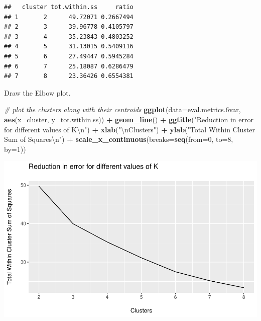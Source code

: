 \documentclass[]{article}
\newenvironment{Shaded}{\begin{snugshade}}{\end{snugshade}}
\newcommand{\KeywordTok}[1]{\textcolor[rgb]{0.13,0.29,0.53}{\textbf{#1}}}
\newcommand{\DataTypeTok}[1]{\textcolor[rgb]{0.13,0.29,0.53}{#1}}
\newcommand{\DecValTok}[1]{\textcolor[rgb]{0.00,0.00,0.81}{#1}}
\newcommand{\CharTok}[1]{\textcolor[rgb]{0.31,0.60,0.02}{#1}}
\newcommand{\StringTok}[1]{\textcolor[rgb]{0.31,0.60,0.02}{#1}}
\newcommand{\CommentTok}[1]{\textcolor[rgb]{0.56,0.35,0.01}{\textit{#1}}}
\newcommand{\OperatorTok}[1]{\textcolor[rgb]{0.81,0.36,0.00}{\textbf{#1}}}
\newcommand{\NormalTok}[1]{#1}
\begin{document}
\begin{verbatim}
##   cluster tot.within.ss     ratio
## 1       2      49.72071 0.2667494
## 2       3      39.96778 0.4105797
## 3       4      35.23843 0.4803252
## 4       5      31.13015 0.5409116
## 5       6      27.49447 0.5945284
## 6       7      25.18087 0.6286479
## 7       8      23.36426 0.6554381
\end{verbatim}

Draw the Elbow plot.

\begin{Shaded}
\begin{Highlighting}[]
\CommentTok{# plot the clusters along with their centroids}
\KeywordTok{ggplot}\NormalTok{(}\DataTypeTok{data=}\NormalTok{eval.metrics.6var, }\KeywordTok{aes}\NormalTok{(}\DataTypeTok{x=}\NormalTok{cluster, }\DataTypeTok{y=}\NormalTok{tot.within.ss)) }\OperatorTok{+}\StringTok{ }
\StringTok{  }\KeywordTok{geom_line}\NormalTok{() }\OperatorTok{+}
\StringTok{  }\KeywordTok{ggtitle}\NormalTok{(}\StringTok{"Reduction in error for different values of K}\CharTok{\textbackslash{}n}\StringTok{"}\NormalTok{) }\OperatorTok{+}
\StringTok{  }\KeywordTok{xlab}\NormalTok{(}\StringTok{"}\CharTok{\textbackslash{}n}\StringTok{Clusters"}\NormalTok{) }\OperatorTok{+}\StringTok{ }
\StringTok{  }\KeywordTok{ylab}\NormalTok{(}\StringTok{"Total Within Cluster Sum of Squares}\CharTok{\textbackslash{}n}\StringTok{"}\NormalTok{) }\OperatorTok{+}
\StringTok{  }\KeywordTok{scale_x_continuous}\NormalTok{(}\DataTypeTok{breaks=}\KeywordTok{seq}\NormalTok{(}\DataTypeTok{from=}\DecValTok{0}\NormalTok{, }\DataTypeTok{to=}\DecValTok{8}\NormalTok{, }\DataTypeTok{by=}\DecValTok{1}\NormalTok{))}
\end{Highlighting}
\end{Shaded}

\begin{center}\includegraphics{7._K-means_Clustering_files/figure-latex/unnamed-chunk-36-1} \end{center}
\end{document}
